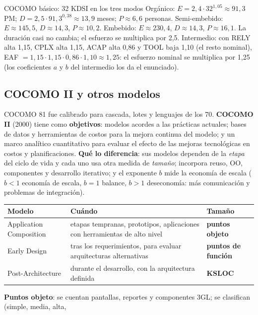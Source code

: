 \documentclass[11pt,a4paper]{article}
\begin{document}
\begin{ejemplo}{COCOMO básico: 32 KDSI en los tres modos}
Orgánico: $E = 2{,}4 \cdot 32^{1{,}05} \approx 91{,}3$ PM; $D = 2{,}5 \cdot 91{,}3^{0{,}38} \approx 13{,}9$ meses;
$P \approx 6{,}6$ personas. Semi-embebido: $E \approx 145{,}5$, $D \approx 14{,}3$, $P \approx 10{,}2$.
Embebido: $E \approx 230{,}4$, $D \approx 14{,}3$, $P \approx 16{,}1$. La duración casi no cambia; el esfuerzo
se multiplica por 2,5. Intermedio: con RELY alta 1,15, CPLX alta 1,15, ACAP alta 0,86 y TOOL baja 1,10 (el resto nominal), EAF $=
1{,}15 \cdot 1{,}15 \cdot 0{,}86 \cdot 1{,}10 \approx 1{,}25$: el esfuerzo nominal se multiplica por 1,25 (los
coeficientes $a$ y $b$ del intermedio los da el enunciado).
\end{ejemplo}

\subsection{COCOMO II y otros modelos}
COCOMO 81 fue calibrado para cascada, lotes y lenguajes de los 70. \textbf{COCOMO II} (2000) tiene como
\textbf{objetivos}: modelos acordes a las prácticas actuales; bases de datos y herramientas de costos para la
mejora continua del modelo; y un marco analítico cuantitativo para evaluar el efecto de las mejoras
tecnológicas en costos y planificaciones. \textbf{Qué lo diferencia}: sus modelos dependen de la \emph{etapa}
del ciclo de vida y cada uno usa otra medida de \emph{tamaño}; incorpora reuso, OO, componentes y desarrollo
iterativo; y el exponente $b$ mide la economía de escala ($b < 1$ economía de escala, $b = 1$ balance, $b > 1$
deseconomía: más comunicación y problemas de integración).
\begin{center}\small
\begin{tabularx}{\textwidth}{@{}l X l@{}}
\toprule
\textbf{Modelo} & \textbf{Cuándo} & \textbf{Tamaño}\\
\midrule
Application Composition & etapas tempranas, prototipos, aplicaciones con herramientas de alto nivel & \textbf{puntos objeto}\\
Early Design & tras los requerimientos, para evaluar arquitecturas alternativas & \textbf{puntos de función}\\
Post-Architecture & durante el desarrollo, con la arquitectura definida & \textbf{KSLOC}\\
\bottomrule
\end{tabularx}
\end{center}
\textbf{Puntos objeto}: se cuentan pantallas, reportes y componentes 3GL; se clasifican (simple, media, alta,
\end{document}
